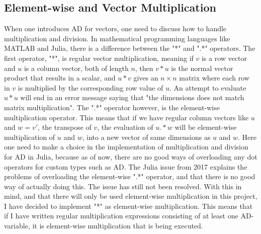 \subsection{Element-wise and Vector Multiplication}
When one introduces AD for vectors, one need to discuss how to handle multiplication and division. In mathematical programming languages like MATLAB and Julia, there is a difference between the "*" and ".*" operators. The first operator, "*", is regular vector multiplication, meaning if $v$ is a row vector and $u$ is a column vector, both of length $n$, then $v*u$ is the normal vector product that results in a scalar, and $u*v$ gives an $n\times n$ matrix where each row in $v$ is multiplied by the corresponding row value of $u$. An attempt to evaluate $u*u$ will end in an error message saying that "the dimensions does not match matrix multiplication". The ".*" operator however, is the element-wise multiplication operator. This means that if we have regular column vectors like $u$ and $w = v'$, the transpose of $v$, the evaluation of $u.*w$ will be element-wise multiplication of $u$ and $w$, into a new vector of same dimensions as $u$ and $w$. Here one need to make a choice in the implementation of multiplication and division for AD in Julia, because as of now, there are no good ways of overloading any dot operators for custom types such as AD. The Julia issue \emph{\cite{JuliaIssueDot}} from 2017 explains the problems of overloading the element-wise ".*" operator, and that there is no good way of actually doing this. The issue has still not been resolved. With this in mind, and that there will only be used element-wise multiplication in this project, I have decided to implement "*" as element-wise multiplication. This means that if I have written regular multiplication expressions consisting of at least one AD-variable, it is element-wise multiplication that is being executed.


